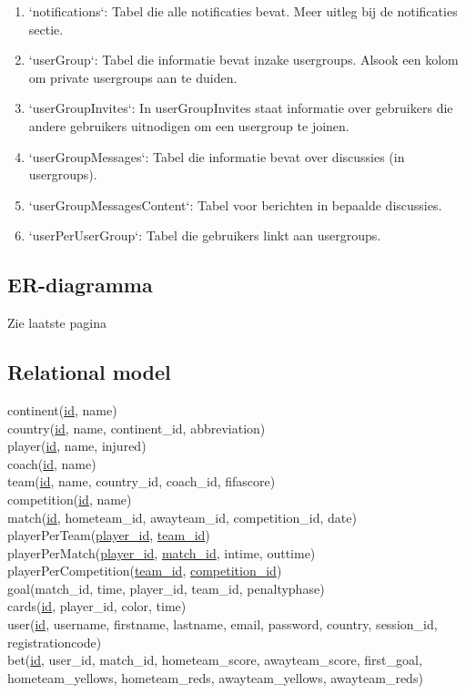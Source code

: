 \documentclass[11pt, a4paper]{article}
\begin{document}
\begin{enumerate}
\item `notifications`: Tabel die alle notificaties bevat. Meer uitleg bij de notificaties sectie.
\item `userGroup`: Tabel die informatie bevat inzake usergroups. Alsook een kolom om private usergroups aan te duiden.
\item `userGroupInvites`: In userGroupInvites staat informatie over gebruikers die andere gebruikers uitnodigen om een usergroup te joinen.
\item `userGroupMessages`: Tabel die informatie bevat over discussies (in usergroups).
\item `userGroupMessagesContent`: Tabel voor berichten in bepaalde discussies.
\item `userPerUserGroup`: Tabel die gebruikers linkt aan usergroups.
\end{enumerate}

\subsection{ER-diagramma}
Zie laatste pagina
\subsection{Relational model}
continent(\uline{id}, name) \\
country(\uline{id}, name, continent\_id, abbreviation) \\
player(\uline{id}, name, injured) \\
coach(\uline{id}, name) \\
team(\uline{id}, name, country\_id, coach\_id, fifascore) \\
competition(\uline{id}, name) \\
match(\uline{id}, hometeam\_id, awayteam\_id, competition\_id, date) \\
playerPerTeam(\uline{player\_id}, \uline{team\_id}) \\
playerPerMatch(\uline{player\_id}, \uline{match\_id}, intime, outtime) \\
playerPerCompetition(\uline{team\_id}, \uline{competition\_id}) \\
goal(match\_id, time, player\_id, team\_id, penaltyphase) \\
cards(\uline{id}, player\_id, color, time) \\
user(\uline{id}, username, firstname, lastname, email, password, country, session\_id, registrationcode) \\
bet(\uline{id}, user\_id, match\_id, hometeam\_score, awayteam\_score, first\_goal, hometeam\_yellows, hometeam\_reds, awayteam\_yellows, awayteam\_reds) \\
\end{document}

